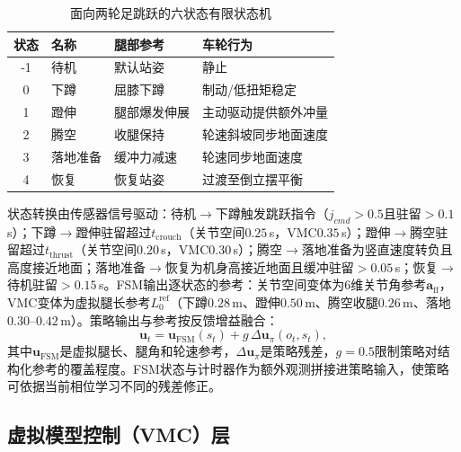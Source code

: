 \documentclass[12pt,a4paper,fontset=fandol]{ctexart}
\numberwithin{equation}{section}
\numberwithin{figure}{section}
\numberwithin{table}{section}
\begin{document}
\begin{table}[htbp]
    \centering
    \caption{面向两轮足跳跃的六状态有限状态机}
    \label{tab:fsm}
    \begin{tabular}{clll}
        \toprule
        状态 & 名称 & 腿部参考 & 车轮行为 \\
        \midrule
        -1 & 待机 & 默认站姿 & 静止 \\
        0 & 下蹲 & 屈膝下蹲 & 制动/低扭矩稳定 \\
        1 & 蹬伸 & 腿部爆发伸展 & 主动驱动提供额外冲量 \\
        2 & 腾空 & 收腿保持 & 轮速斜坡同步地面速度 \\
        3 & 落地准备 & 缓冲力减速 & 轮速同步地面速度 \\
        4 & 恢复 & 恢复站姿 & 过渡至倒立摆平衡 \\
        \bottomrule
    \end{tabular}
\end{table}

状态转换由传感器信号驱动：待机$\to$下蹲触发跳跃指令（$j_{cmd}>0.5$且驻留$>0.1$\,s）；下蹲$\to$蹬伸驻留超过$t_{\text{crouch}}$（关节空间$0.25$\,s，VMC$0.35$\,s）；蹬伸$\to$腾空驻留超过$t_{\text{thrust}}$（关节空间$0.20$\,s，VMC$0.30$\,s）；腾空$\to$落地准备为竖直速度转负且高度接近地面；落地准备$\to$恢复为机身高接近地面且缓冲驻留$>0.05$\,s；恢复$\to$待机驻留$>0.15$\,s。FSM输出逐状态的参考：关节空间变体为6维关节角参考$ \bm{a}_{\text{ff}}$，VMC变体为虚拟腿长参考$L_0^{\text{ref}}$（下蹲$0.28$\,m、蹬伸$0.50$\,m、腾空收腿$0.26$\,m、落地$0.30$--$0.42$\,m）。策略输出与参考按反馈增益融合：
\begin{equation}
\bm{u}_t = \bm{u}_{\mathrm{FSM}}(s_t) + g\,\Delta\bm{u}_{\pi}(o_t,s_t),
\label{eq:action}
\end{equation}
其中$\bm{u}_{\mathrm{FSM}}$是虚拟腿长、腿角和轮速参考，$\Delta\bm{u}_{\pi}$是策略残差，$g=0.5$限制策略对结构化参考的覆盖程度。FSM状态与计时器作为额外观测拼接进策略输入，使策略可依据当前相位学习不同的残差修正。

\subsection{虚拟模型控制（VMC）层}
\end{document}
